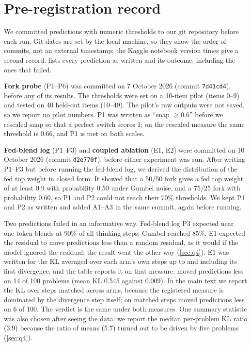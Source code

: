 \section{Pre-registration record}\label{app:prereg}

We committed predictions with numeric thresholds to our git repository before each run.
Git dates are set by the local machine, so they show the order of commits, not an external timestamp; the Kaggle
notebook version times give a second record.
 lists every prediction as written and its outcome, including the ones that failed.

\textbf{Fork probe} (P1--P6) was committed on 7 October 2026 (commit \texttt{7d41cd4}), before any of its results. %
The thresholds were set on a 10-item pilot (items 0--9) and tested on 40 held-out items (10--49). %
The pilot's raw outputs were not saved, so we report no pilot numbers.
P1 was written as ``snap $\geq 0.6$'' before we rescaled snap so that a perfect switch scores 1; %
on the rescaled measure the same threshold is 0.66, and P1 is met on both scales. %

\textbf{Fed-blend log} (P1--P3) and \textbf{coupled ablation} (E1, E2) were committed on 10 October 2026 (commit \texttt{d2e770f}), %
before either experiment was run.
After writing P1--P3 but before running the fed-blend log, we derived the distribution of the fed top weight in closed form.
It showed that a 50/50 fork gives a fed top weight of at least 0.9 with probability 0.50 under Gumbel noise, and a %
75/25 fork with probability 0.60, so P1 and P2 could not reach their 70\% thresholds. %
We kept P1 and P2 as written and added A1--A3 in the same commit, again before running.

Two predictions failed in an informative way.
Fed-blend log P3 expected near one-token blends at 90\% of all thinking steps; Gumbel reached 85\%. %
E1 expected the residual to move predictions less than a random residual, as it would if the model ignored the
residual; the result went the other way (\cref{sec:q4}).
E1 was written for the KL averaged over each arm's own steps up to and including its first divergence, and the
table reports it on that measure: \ST{} moved predictions less on 14 of 100 problems (mean KL 0.545 against %
0.009). %
In the main text we report the KL over steps matched across arms, because the registered measure is dominated by the
divergence step itself; on matched steps \ST{} moved predictions less on 6 of 100. %
The verdict is the same under both measures.
One summary statistic was also chosen after seeing the data: we report the median per-problem KL ratio (3.9) %
because the ratio of means (5.7) turned out to be driven by five problems (\cref{sec:q4}). %
